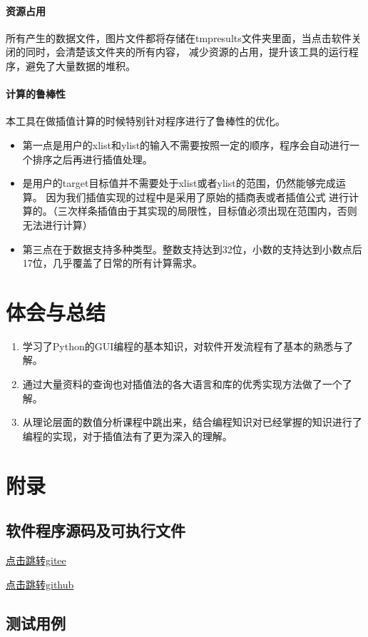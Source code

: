 \documentclass[UTF8]{ctexart}
\begin{document}
        \paragraph{资源占用} 所有产生的数据文件，图片文件都将存储在tmpresults文件夹里面，当点击软件关闭的同时，会清楚该文件夹的所有内容，
        减少资源的占用，提升该工具的运行程序，避免了大量数据的堆积。
        \paragraph{计算的鲁棒性} 本工具在做插值计算的时候特别针对程序进行了鲁棒性的优化。
            \begin{itemize}
                \item 第一点是用户的xlist和ylist的输入不需要按照一定的顺序，程序会自动进行一个排序之后再进行插值处理。
                \item 是用户的target目标值并不需要处于xlist或者ylist的范围，仍然能够完成运算。
                        因为我们插值实现的过程中是采用了原始的插商表或者插值公式
                        进行计算的。（三次样条插值由于其实现的局限性，目标值必须出现在范围内，否则无法进行计算）
                \item 第三点在于数据支持多种类型。整数支持达到32位，小数的支持达到小数点后17位，几乎覆盖了日常的所有计算需求。
            \end{itemize}
    \section{体会与总结}
        \begin{enumerate}
            \item 学习了Python的GUI编程的基本知识，对软件开发流程有了基本的熟悉与了解。
            \item 通过大量资料的查询也对插值法的各大语言和库的优秀实现方法做了一个了解。
            \item 从理论层面的数值分析课程中跳出来，结合编程知识对已经掌握的知识进行了编程的实现，对于插值法有了更为深入的理解。
            
        \end{enumerate}
    \section{附录}
        \subsection{软件程序源码及可执行文件}
        \href{https://gitee.com/hxh_create/numerical-analysis-operation}{点击跳转gitee}
        
        \href{https://github.com/hxhcreate/numerical-analysis-work/tree/master}{点击跳转github}
        \subsection{测试用例}
        \begin{figure}
            
        \end{figure}
    
\end{document}
